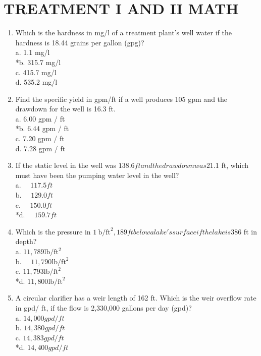 \section{TREATMENT I AND II MATH}
\begin{enumerate}
  \item Which is the hardness in mg/l of a treatment plant's well water if the hardness is 18.44 grains per gallon (gpg)?\\
a. 1.1 mg/l\\
*b. 315.7 mg/l\\
c. 415.7 mg/l\\
d. 535.2 mg/l\\
  \item Find the specific yield in gpm/ft if a well produces 105 gpm and the drawdown for the well is 16.3 ft.\\
a. 6.00 gpm / ft\\
*b. 6.44 gpm / ft\\
c. 7.20 gpm / ft\\
d. 7.28 gpm / ft\\
  \item If the static level in the well was $138.6 ft and the drawdown was $21.1 ft, which must have been the pumping water level in the well?\\
a. $\quad 117.5 ft$\\
b. $\quad 129.0 ft$\\
c. $\quad 150.0 ft$\\
*d. $\quad 159.7 ft$\\
  \item Which is the pressure in $1 \mathrm{~b} / \mathrm{ft}^{2}, 189 ft below a lake's surface if the lake is $386 ft in depth?\\
a. $11,789 \mathrm{lb} / \mathrm{ft}^{2}$\\
b. $\quad 11,790 \mathrm{lb} / \mathrm{ft}^{2}$\\
c. $11,793 \mathrm{lb} / \mathrm{ft}^{2}$\\
*d. $11,800 \mathrm{lb} / \mathrm{ft}^{2}$\\
  \item A circular clarifier has a weir length of 162 ft. Which is the weir overflow rate in gpd/ ft, if the flow is 2,330,000 gallons per day (gpd)?\\
a. $14,000 gpd / ft$\\
b. $14,380 gpd / ft$\\
c. $14,383 gpd / ft$\\
*d. $14,400 gpd / ft$\\

\end{enumerate}
